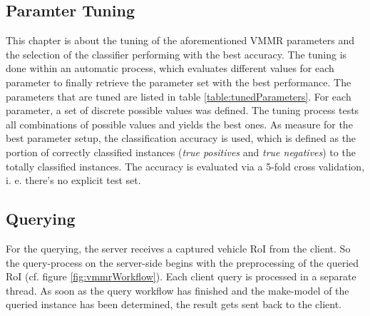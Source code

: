 \subsection{Paramter Tuning}\label{sec:parameterTuning}
This chapter is about the tuning of the aforementioned VMMR parameters and the selection of the classifier performing with the best accuracy. The tuning is done within an automatic process, which evaluates different values for each parameter to finally retrieve the parameter set with the best performance. The parameters that are tuned are listed in table \ref{table:tunedParameters}. For each parameter, a set of discrete possible values was defined. The tuning process tests all combinations of possible values and yields the best ones. As measure for the best parameter setup, the classification accuracy is used, which is defined as the portion of correctly classified instances (\emph{true positives} and \emph{true negatives}) to the totally classified instances. The accuracy is evaluated via a 5-fold cross validation, i. e. there's no explicit test set.

\subsection{Querying}
For the querying, the server receives a captured vehicle RoI from the client. So the query-process on the server-side begins with the preprocessing of the queried RoI (cf. figure \ref{fig:vmmrWorkflow}). Each client query is processed in a separate thread. As soon as the query workflow has finished and the make-model of the queried instance has been determined, the result gets sent back to the client.

